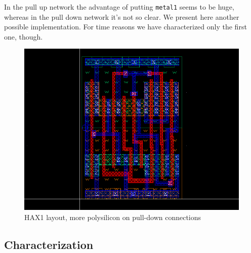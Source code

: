 \documentclass[a4paper]{article}
\begin{document}
In the pull up network the advantage of putting \texttt{metal1} seems to be huge, whereas in the pull down network it's not so clear. We present here another possible implementation. For time reasons we have characterized only the first one, though.

\begin{figure}[H]
      \centering
       \includegraphics[width=12cm]{./Images/HA/HAX1_poly_layout.png}
\caption{HAX1 layout, more polysilicon on pull-down connections}
\label{fig: HAX1_layPoly_drw}
\end{figure}

\subsection{Characterization}
\end{document}
